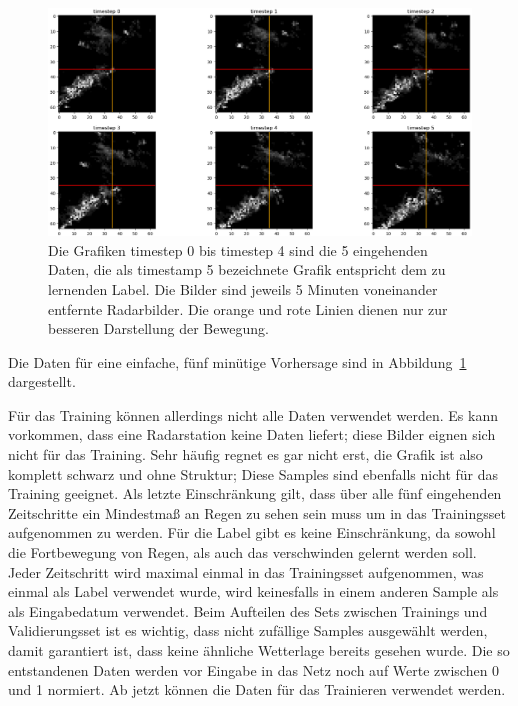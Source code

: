 \begin{figure}[h]
	\includegraphics[width=\linewidth]{pics/5Daten_1Label_Radar.png}
	\caption[Beispielhaftes Trainingssample zur Vorhersage von 5 Minuten]{Die Grafiken timestep 0 bis timestep 4 sind die 5 eingehenden Daten, die als timestamp 5 bezeichnete Grafik entspricht dem zu lernenden Label. Die Bilder sind jeweils 5 Minuten voneinander entfernte Radarbilder. Die orange und rote Linien dienen nur zur besseren Darstellung der Bewegung.}
	\label{5D1L}
\end{figure}

Die Daten für eine einfache, fünf minütige Vorhersage sind in Abbildung~\ref{5D1L} dargestellt.

Für das Training können allerdings nicht alle Daten verwendet werden. Es kann vorkommen, dass eine Radarstation keine Daten liefert; diese Bilder eignen sich nicht für das Training. Sehr häufig regnet es gar nicht erst, die Grafik ist also komplett schwarz und ohne Struktur; Diese Samples sind ebenfalls nicht für das Training geeignet. Als letzte Einschränkung gilt, dass über alle fünf eingehenden Zeitschritte ein Mindestmaß an Regen zu sehen sein muss um in das Trainingsset aufgenommen zu werden. Für die Label gibt es keine Einschränkung, da sowohl die Fortbewegung von Regen, als auch das verschwinden gelernt werden soll. Jeder Zeitschritt wird maximal einmal in das Trainingsset aufgenommen, was einmal als Label verwendet wurde, wird keinesfalls in einem anderen Sample als als Eingabedatum verwendet. Beim Aufteilen des Sets zwischen Trainings und Validierungsset ist es wichtig, dass nicht zufällige Samples ausgewählt werden, damit garantiert ist, dass keine ähnliche Wetterlage bereits gesehen wurde.
Die so entstandenen Daten werden vor Eingabe in das Netz noch auf Werte zwischen 0 und 1 normiert. Ab jetzt können die Daten für das Trainieren verwendet werden.


